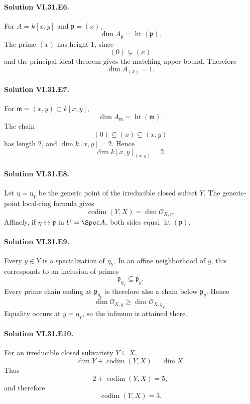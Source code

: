 \paragraph{Solution VI.31.E6.}
For \(A=k[x,y]\) and \(\mathfrak p=(x)\),
\[
\dim A_{\mathfrak p}=\operatorname{ht}(\mathfrak p).
\]
The prime \((x)\) has height \(1\), since
\[
(0)\subsetneq(x)
\]
and the principal ideal theorem gives the matching upper bound.  Therefore
\[
\boxed{\dim A_{(x)}=1}.
\]

\paragraph{Solution VI.31.E7.}
For \(\mathfrak m=(x,y)\subset k[x,y]\),
\[
\dim A_{\mathfrak m}=\operatorname{ht}(\mathfrak m).
\]
The chain
\[
(0)\subsetneq(x)\subsetneq(x,y)
\]
has length \(2\), and \(\dim k[x,y]=2\).  Hence
\[
\boxed{\dim k[x,y]_{(x,y)}=2}.
\]

\paragraph{Solution VI.31.E8.}
Let \(\eta=\eta_Y\) be the generic point of the irreducible closed subset \(Y\).  The generic-point local-ring
formula gives
\[
\boxed{\operatorname{codim}(Y,X)=\dim\mathcal O_{X,\eta}}.
\]
Affinely, if \(\eta\leftrightarrow\mathfrak p\) in \(U=\Spec A\), both sides equal
\(\operatorname{ht}(\mathfrak p)\).

\paragraph{Solution VI.31.E9.}
Every \(y\in Y\) is a specialization of \(\eta_Y\).  In an affine neighborhood of \(y\), this corresponds to an
inclusion of primes
\[
\mathfrak p_{\eta_Y}\subseteq\mathfrak p_y.
\]
Every prime chain ending at \(\mathfrak p_{\eta_Y}\) is therefore also a chain below \(\mathfrak p_y\).  Hence
\[
\dim\mathcal O_{X,y}\ge\dim\mathcal O_{X,\eta_Y}.
\]
Equality occurs at \(y=\eta_Y\), so the infimum is attained there.

\paragraph{Solution VI.31.E10.}
For an irreducible closed subvariety \(Y\subseteq X\),
\[
\dim Y+\operatorname{codim}(Y,X)=\dim X.
\]
Thus
\[
2+\operatorname{codim}(Y,X)=5,
\]
and therefore
\[
\boxed{\operatorname{codim}(Y,X)=3}.
\]

